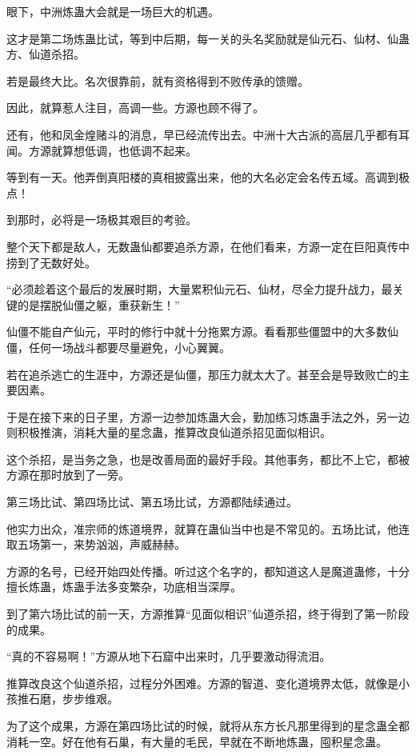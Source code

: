 \begin{this_body}
眼下，中洲炼蛊大会就是一场巨大的机遇。

这才是第二场炼蛊比试，等到中后期，每一关的头名奖励就是仙元石、仙材、仙蛊方、仙道杀招。

若是最终大比。名次很靠前，就有资格得到不败传承的馈赠。

因此，就算惹人注目，高调一些。方源也顾不得了。

还有，他和凤金煌赌斗的消息，早已经流传出去。中洲十大古派的高层几乎都有耳闻。方源就算想低调，也低调不起来。

等到有一天。他弄倒真阳楼的真相披露出来，他的大名必定会名传五域。高调到极点！

到那时，必将是一场极其艰巨的考验。

整个天下都是敌人，无数蛊仙都要追杀方源，在他们看来，方源一定在巨阳真传中捞到了无数好处。

“必须趁着这个最后的发展时期，大量累积仙元石、仙材，尽全力提升战力，最关键的是摆脱仙僵之躯，重获新生！”

仙僵不能自产仙元，平时的修行中就十分拖累方源。看看那些僵盟中的大多数仙僵，任何一场战斗都要尽量避免，小心翼翼。

若在追杀逃亡的生涯中，方源还是仙僵，那压力就太大了。甚至会是导致败亡的主要因素。

于是在接下来的日子里，方源一边参加炼蛊大会，勤加练习炼蛊手法之外，另一边则积极推演，消耗大量的星念蛊，推算改良仙道杀招见面似相识。

这个杀招，是当务之急，也是改善局面的最好手段。其他事务，都比不上它，都被方源在那时放到了一旁。

第三场比试、第四场比试、第五场比试，方源都陆续通过。

他实力出众，准宗师的炼道境界，就算在蛊仙当中也是不常见的。五场比试，他连取五场第一，来势汹汹，声威赫赫。

方源的名号，已经开始四处传播。听过这个名字的，都知道这人是魔道蛊修，十分擅长炼蛊，炼蛊手法多变繁杂，功底相当深厚。

到了第六场比试的前一天，方源推算“见面似相识”仙道杀招，终于得到了第一阶段的成果。

“真的不容易啊！”方源从地下石窟中出来时，几乎要激动得流泪。

推算改良这个仙道杀招，过程分外困难。方源的智道、变化道境界太低，就像是小孩推石磨，步步维艰。

为了这个成果，方源在第四场比试的时候，就将从东方长凡那里得到的星念蛊全都消耗一空。好在他有石巢，有大量的毛民，早就在不断地炼蛊，囤积星念蛊。


\end{this_body}
